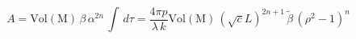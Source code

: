 \begin{equation}
A=\mathrm{Vol(M)}\,\beta\,\alpha^{2n}\,\int \,d\tau=\frac{4\pi
p}{\lambda\,k}\mathrm{Vol(M)}\,(\sqrt{c}L)^{2n+1}\,\tilde{\beta}\,(\rho^2-1)^n
\end{equation}

